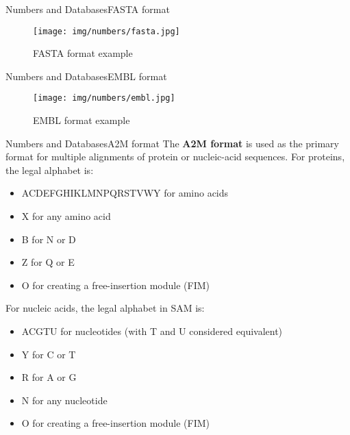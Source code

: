 \documentclass[10pt]{beamer}
\newcommand{\1}{
	\setbeamertemplate{background}{
		\texttt{[image: img/1]}
		\tikz[overlay] \fill[fill opacity=0.75,fill=white] (0,0) rectangle (-\paperwidth,\paperheight);
	}
}
\begin{document}
\begin{frame}{Numbers and Databases}{FASTA format}
\begin{figure}[]
 \centering
    \texttt{[image: img/numbers/fasta.jpg]}
    \label{img:mot2}
    \caption{FASTA format example}
\end{figure}
\end{frame}

\begin{frame}{Numbers and Databases}{EMBL format}
\begin{figure}[]
 \centering
    \texttt{[image: img/numbers/embl.jpg]}
    \label{img:mot2}
    \caption{EMBL format example}
\end{figure}
\end{frame}

\begin{frame}{Numbers and Databases}{A2M format}
The \textbf{A2M format} is used as the primary format for multiple alignments of protein or nucleic-acid sequences. For proteins, the legal alphabet is:
\begin{itemize}
    \item  ACDEFGHIKLMNPQRSTVWY for amino acids
    \item  X for any amino acid
    \item  B for N or D
    \item  Z for Q or E
    \item  O for creating a free-insertion module (FIM) 
\end{itemize}

For nucleic acids, the legal alphabet in SAM is:
\begin{itemize}
    \item  ACGTU for nucleotides (with T and U considered equivalent)
    \item  Y for C or T
    \item  R for A or G
    \item  N for any nucleotide
    \item  O for creating a free-insertion module (FIM) 
\end{itemize}
\end{frame}
\end{document}
